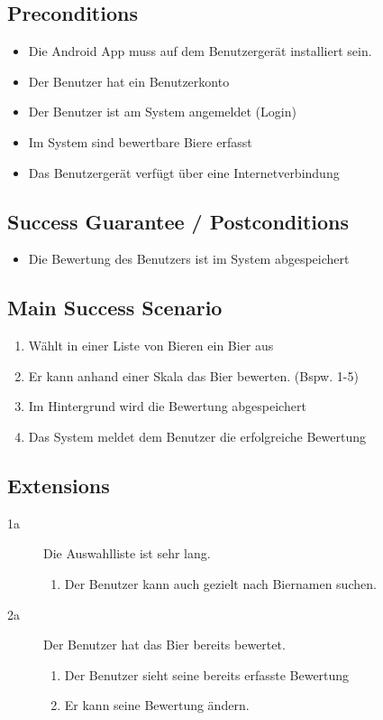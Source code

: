 \documentclass[10pt,a4paper]{scrartcl}
\begin{document}
\subsection*{Preconditions}

\begin{itemize}
\item Die Android App muss auf dem Benutzergerät installiert sein.
\item Der Benutzer hat ein Benutzerkonto
\item Der Benutzer ist am System angemeldet (Login)
\item Im System sind bewertbare Biere erfasst
\item Das Benutzergerät verfügt über eine Internetverbindung
\end{itemize}


\subsection*{Success Guarantee / Postconditions}
\begin{itemize}
\item Die Bewertung des Benutzers ist im System abgespeichert
\end{itemize}


\subsection*{Main Success Scenario}

\begin{enumerate}
\item Wählt in einer Liste von Bieren ein Bier aus
\item Er kann anhand einer Skala das Bier bewerten. (Bspw. 1-5)
\item Im Hintergrund wird die Bewertung abgespeichert
\item Das System meldet dem Benutzer die erfolgreiche Bewertung
\end{enumerate}


\subsection*{Extensions}

\begin{description}
\item[1a] Die Auswahlliste ist sehr lang.
	\begin{enumerate}
	\item Der Benutzer kann auch gezielt nach Biernamen suchen.
	\end{enumerate}
\item[2a] Der Benutzer hat das Bier bereits bewertet.
	\begin{enumerate}
	\item Der Benutzer sieht seine bereits erfasste Bewertung
	\item Er kann seine Bewertung ändern.
	\end{enumerate}

\end{description}
\end{document}
